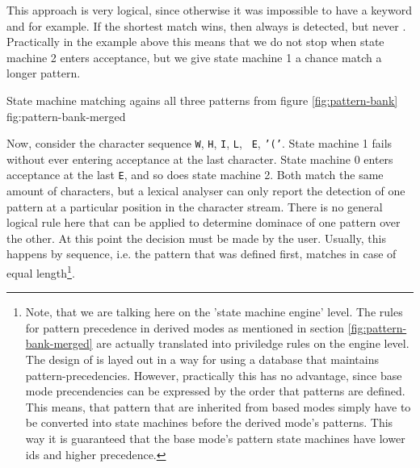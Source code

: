 
This approach is very logical, since otherwise it was impossible to have a
keyword  and  for example. If the shortest match
wins, then always  is detected, but never .
Practically in the example above this means that we do not stop when state
machine 2 enters acceptance, but we give state machine 1 a chance match a
longer pattern.

        {State machine matching agains all three patterns from figure \ref{fig:pattern-bank}
	    }
        {fig:pattern-bank-merged}

Now, consider the character sequence {\tt W}, {\tt H}, {\tt I}, {\tt L}, {\tt
    E}, {\tt '('}.  State machine 1 fails without ever entering acceptance at
    the last character. State machine 0 enters acceptance at the last {\tt E},
    and so does state machine 2. Both match the same amount of characters, but
    a lexical analyser can only report the detection of one pattern at a
    particular position in the character stream. There is no general logical
    rule here that can be applied to determine dominace of one pattern over the
    other. At this point the decision must be made by the user. Usually, this
    happens by sequence, i.e. the pattern that was defined first, matches in
    case of equal length\footnote{Note, that we are talking here on the 'state
	machine engine' level. The rules for pattern precedence in derived
	    modes as mentioned in section \ref{fig:pattern-bank-merged} are actually translated into
	    priviledge rules on the engine level. The design of {\quex} 
	       is layed out in a way for using a database that maintains 
	    pattern-precedencies. However, practically this has no advantage, since
	   base mode precendencies can be expressed by the order that patterns are defined.
	   This means, that pattern that are inherited from based modes simply have to 
	  be converted into state machines before the derived mode's patterns. This way it is guaranteed
	 that the base mode's pattern state machines have lower ids and higher precedence.}.



